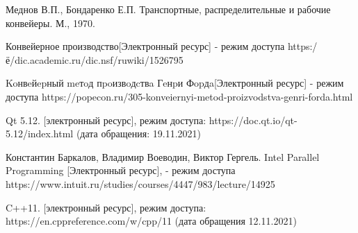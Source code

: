 \renewcommand\bibname{Список литературы}
\begin{thebibliography}{3}
	 Меднов В.П., Бондаренко Е.П. Транспортные, распределительные и рабочие конвейеры. М., 1970.
	
	 Конвейерное производство[Электронный ресурс] - режим доступа https:/ё/dic.academic.ru/dic.nsf/ruwiki/1526795
	
	 Koнвeйepный meтoд пpoизвoдcтвa Гeнpи Фopдa[Электронный ресурс] - режим доступа https://popecon.ru/305-konveiernyi-metod-proizvodstva-genri-forda.html
	
	Qt 5.12. [электронный ресурс], режим доступа: https://doc.qt.io/qt-5.12/index.html (дата обращения: 19.11.2021)
	
	Константин Баркалов, Владимир Воеводин, Виктор Гергель. Intel Parallel Programming [Электронный ресурс], - режим доступа https://www.intuit.ru/studies/courses/4447/983/lecture/14925
	
	C++11. [электронный ресурс], режим доступа: https://en.cppreference.com/w/cpp/11 (дата обращения 12.11.2021)	
	
\end{thebibliography}